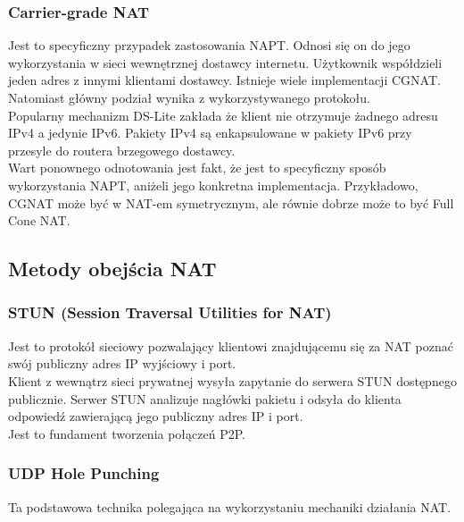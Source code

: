 \subsubsection{Carrier-grade NAT}
Jest to specyficzny przypadek zastosowania NAPT. Odnosi się on do jego wykorzystania w sieci wewnętrznej dostawcy internetu. Użytkownik współdzieli jeden adres z innymi klientami dostawcy. Istnieje wiele implementacji CGNAT. Natomiast główny podział wynika z wykorzystywanego protokołu.\\

Popularny mechanizm DS-Lite zakłada że klient nie otrzymuje żadnego adresu IPv4 a jedynie IPv6. Pakiety IPv4 są enkapsulowane w pakiety IPv6 przy przesyle do routera brzegowego dostawcy.\\

Wart ponownego odnotowania jest fakt, że jest to specyficzny sposób wykorzystania NAPT, aniżeli jego konkretna implementacja. Przykładowo, CGNAT może być w NAT-em symetrycznym, ale równie dobrze może to być Full Cone NAT.

\newpage

\subsection{Metody obejścia NAT}

\subsubsection{STUN (Session Traversal Utilities for NAT)}

Jest to protokół sieciowy pozwalający klientowi znajdującemu się za NAT poznać swój publiczny adres IP wyjściowy i port.\\

Klient z wewnątrz sieci prywatnej wysyła zapytanie do serwera STUN dostępnego publicznie. Serwer STUN analizuje nagłówki pakietu i odsyła do klienta odpowiedź zawierającą jego publiczny adres IP i port.\\

Jest to fundament tworzenia połączeń P2P.

\subsubsection{UDP Hole Punching}

Ta podstawowa technika polegająca na wykorzystaniu mechaniki działania NAT.\\

